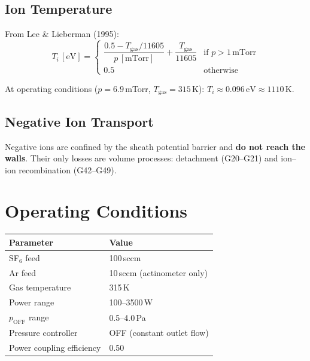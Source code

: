 \documentclass[11pt,a4paper]{article}
\newcommand{\eunit}{\,\textrm{eV}}
\begin{document}
\subsection{Ion Temperature}

From Lee \& Lieberman (1995):
\begin{equation}
  T_i\,[\text{eV}] = \begin{cases}
    \dfrac{0.5 - T_\text{gas}/11605}{p\,[\text{mTorr}]} + \dfrac{T_\text{gas}}{11605} & \text{if } p > 1\,\text{mTorr} \\[6pt]
    0.5 & \text{otherwise}
  \end{cases}
\end{equation}

At operating conditions ($p = 6.9$\,mTorr, $T_\text{gas} = 315$\,K): $T_i \approx 0.096\eunit \approx 1110$\,K.

\subsection{Negative Ion Transport}

Negative ions are confined by the sheath potential barrier and \textbf{do not reach the walls}. Their only losses are volume processes: detachment (G20--G21) and ion--ion recombination (G42--G49).

\section{Operating Conditions}

\begin{table}[h]
\centering
\begin{tabular}{ll}
\toprule
\textbf{Parameter} & \textbf{Value} \\
\midrule
SF$_6$ feed & 100\,sccm \\
Ar feed & 10\,sccm (actinometer only) \\
Gas temperature & 315\,K \\
Power range & 100--3500\,W \\
$p_\text{OFF}$ range & 0.5--4.0\,Pa \\
Pressure controller & OFF (constant outlet flow) \\
Power coupling efficiency & 0.50 \\
\bottomrule
\end{tabular}
\end{table}
\end{document}
